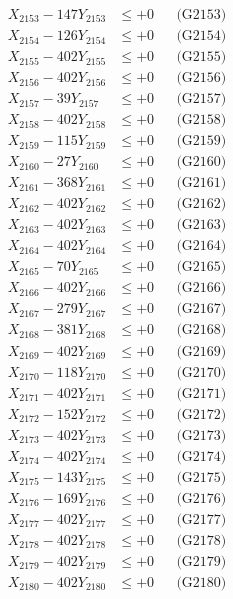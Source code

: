 \documentclass[a4paper,10pt]{article}
\begin{document}
{\begin{align}
X_{2153} - 147Y_{2153} &\leq +0 && \text{(G2153)} \\
X_{2154} - 126Y_{2154} &\leq +0 && \text{(G2154)} \\
X_{2155} - 402Y_{2155} &\leq +0 && \text{(G2155)} \\
X_{2156} - 402Y_{2156} &\leq +0 && \text{(G2156)} \\
X_{2157} - 39Y_{2157} &\leq +0 && \text{(G2157)} \\
X_{2158} - 402Y_{2158} &\leq +0 && \text{(G2158)} \\
X_{2159} - 115Y_{2159} &\leq +0 && \text{(G2159)} \\
X_{2160} - 27Y_{2160} &\leq +0 && \text{(G2160)} \\
\allowbreak
X_{2161} - 368Y_{2161} &\leq +0 && \text{(G2161)} \\
X_{2162} - 402Y_{2162} &\leq +0 && \text{(G2162)} \\
X_{2163} - 402Y_{2163} &\leq +0 && \text{(G2163)} \\
X_{2164} - 402Y_{2164} &\leq +0 && \text{(G2164)} \\
X_{2165} - 70Y_{2165} &\leq +0 && \text{(G2165)} \\
X_{2166} - 402Y_{2166} &\leq +0 && \text{(G2166)} \\
X_{2167} - 279Y_{2167} &\leq +0 && \text{(G2167)} \\
X_{2168} - 381Y_{2168} &\leq +0 && \text{(G2168)} \\
X_{2169} - 402Y_{2169} &\leq +0 && \text{(G2169)} \\
X_{2170} - 118Y_{2170} &\leq +0 && \text{(G2170)} \\
\allowbreak
X_{2171} - 402Y_{2171} &\leq +0 && \text{(G2171)} \\
X_{2172} - 152Y_{2172} &\leq +0 && \text{(G2172)} \\
X_{2173} - 402Y_{2173} &\leq +0 && \text{(G2173)} \\
X_{2174} - 402Y_{2174} &\leq +0 && \text{(G2174)} \\
X_{2175} - 143Y_{2175} &\leq +0 && \text{(G2175)} \\
X_{2176} - 169Y_{2176} &\leq +0 && \text{(G2176)} \\
X_{2177} - 402Y_{2177} &\leq +0 && \text{(G2177)} \\
X_{2178} - 402Y_{2178} &\leq +0 && \text{(G2178)} \\
X_{2179} - 402Y_{2179} &\leq +0 && \text{(G2179)} \\
X_{2180} - 402Y_{2180} &\leq +0 && \text{(G2180)} \\

\end{align}}
\end{document}
